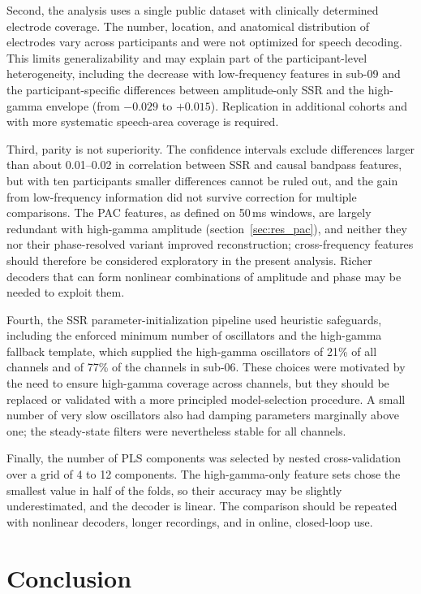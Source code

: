 \documentclass{iopjournal}
\begin{document}
Second, the analysis uses a single public dataset with clinically determined electrode coverage. The number, location, and anatomical distribution of electrodes vary across participants and were not optimized for speech decoding. This limits generalizability and may explain part of the participant-level heterogeneity, including the decrease with low-frequency features in sub-09 and the participant-specific differences between amplitude-only SSR and the high-gamma envelope (from $-0.029$ to $+0.015$). Replication in additional cohorts and with more systematic speech-area coverage is required.

Third, parity is not superiority. The confidence intervals exclude differences larger than about 0.01--0.02 in correlation between SSR and causal bandpass features, but with ten participants smaller differences cannot be ruled out, and the gain from low-frequency information did not survive correction for multiple comparisons. The PAC features, as defined on 50\,ms windows, are largely redundant with high-gamma amplitude (section~\ref{sec:res_pac}), and neither they nor their phase-resolved variant improved reconstruction; cross-frequency features should therefore be considered exploratory in the present analysis. Richer decoders that can form nonlinear combinations of amplitude and phase may be needed to exploit them.

Fourth, the SSR parameter-initialization pipeline used heuristic safeguards, including the enforced minimum number of oscillators and the high-gamma fallback template, which supplied the high-gamma oscillators of 21\% of all channels and of 77\% of the channels in sub-06. These choices were motivated by the need to ensure high-gamma coverage across channels, but they should be replaced or validated with a more principled model-selection procedure. A small number of very slow oscillators also had damping parameters marginally above one; the steady-state filters were nevertheless stable for all channels.

Finally, the number of PLS components was selected by nested cross-validation over a grid of 4 to 12 components. The high-gamma-only feature sets chose the smallest value in half of the folds, so their accuracy may be slightly underestimated, and the decoder is linear. The comparison should be repeated with nonlinear decoders, longer recordings, and in online, closed-loop use.

\section{Conclusion}
\end{document}

